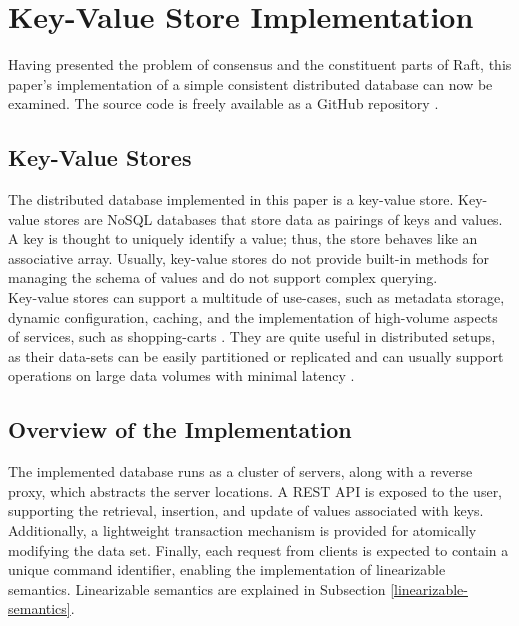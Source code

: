 \chapter{Key-Value Store Implementation}

Having presented the problem of consensus and the constituent parts of Raft, this paper's implementation of a simple consistent distributed database can now be examined. The source code is freely available as a GitHub repository \cite{stoufexis-raft}.

\section{Key-Value Stores}

The distributed database implemented in this paper is a key-value store. Key-value stores are NoSQL databases that store data as pairings of keys and values. A key is thought to uniquely identify a value; thus, the store behaves like an associative array. Usually, key-value stores do not provide built-in methods for managing the schema of values and do not support complex querying.\\

Key-value stores can support a multitude of use-cases, such as metadata storage, dynamic configuration, caching, and the implementation of high-volume aspects of services, such as shopping-carts \cite{aws-kv-stores,consul-kv-stores}. They are quite useful in distributed setups, as their data-sets can be easily partitioned or replicated and can usually support operations on large data volumes with minimal latency \cite{aws-kv-stores}.\\

\section{Overview of the Implementation} \label{impl-overview}

The implemented database runs as a cluster of servers, along with a reverse proxy, which abstracts the server locations. A REST API is exposed to the user, supporting the retrieval, insertion, and update of values associated with keys. Additionally, a lightweight transaction mechanism is provided for atomically modifying the data set. Finally, each request from clients is expected to contain a unique command identifier, enabling the implementation of linearizable semantics. Linearizable semantics are explained in Subsection \ref{linearizable-semantics}.\\

